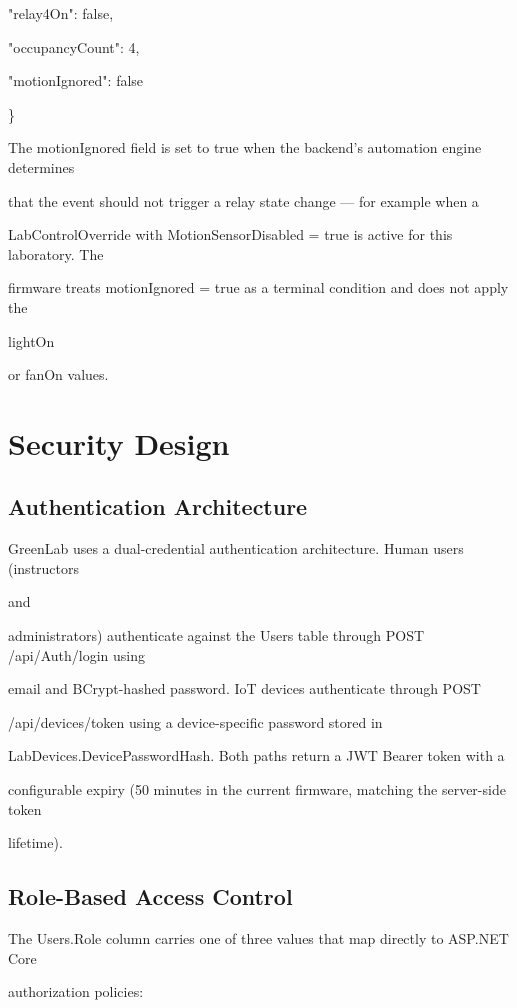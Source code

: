 "relay4On": false,

"occupancyCount": 4,

"motionIgnored": false

\}

The motionIgnored field is set to true when the backend's automation engine determines

that the event should not trigger a relay state change --- for example when a

LabControlOverride with MotionSensorDisabled = true is active for this laboratory. The

firmware treats motionIgnored = true as a terminal condition and does not apply the

lightOn

or fanOn values.


\section{Security Design}

\subsection{Authentication Architecture}
GreenLab uses a dual-credential authentication architecture. Human users (instructors

and

administrators) authenticate against the Users table through POST /api/Auth/login using

email and BCrypt-hashed password. IoT devices authenticate through POST

/api/devices/token using a device-specific password stored in

LabDevices.DevicePasswordHash. Both paths return a JWT Bearer token with a

configurable expiry (50 minutes in the current firmware, matching the server-side token

lifetime).


\subsection{Role-Based Access Control}
The Users.Role column carries one of three values that map directly to ASP.NET Core

authorization policies:

